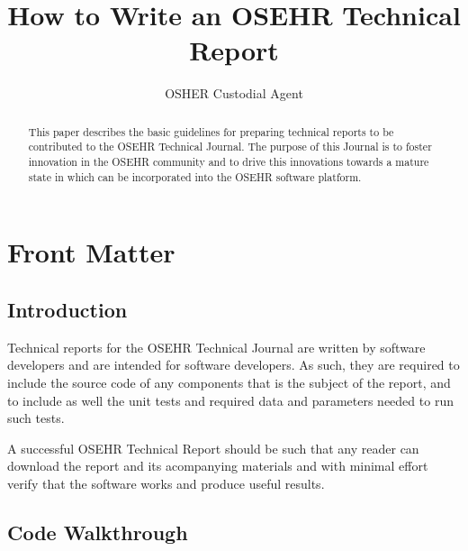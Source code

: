 \documentclass{InsightArticle}
\title{How to Write an OSEHR Technical Report}
\author{OSHER Custodial Agent}
\newcommand{\IJhandlerIDnumber}{1}
\begin{document}
%
%
\IJhandlefooter{\IJhandlerIDnumber}


\ifpdf
\else
\fi


\maketitle


\ifhtml
\chapter*{Front Matter\label{front}}
\fi


\begin{abstract}
\noindent
This paper describes the basic guidelines for preparing technical
reports to be contributed to the OSEHR Technical Journal. The purpose of this
Journal is to foster innovation in the OSEHR community and to drive this
innovations towards a mature state in which can be incorporated into the OSEHR
software platform.
\end{abstract}

\tableofcontents

\section{Introduction}

Technical reports for the OSEHR Technical Journal are written by software
developers and are intended for software developers. As such, they are required
to include the source code of any components that is the subject of the report,
and to include as well the unit tests and required data and parameters needed
to run such tests.

A successful OSEHR Technical Report should be such that any reader can download
the report and its acompanying materials and with minimal effort verify that the
software works and produce useful results.

\section{Code Walkthrough}
\end{document}
